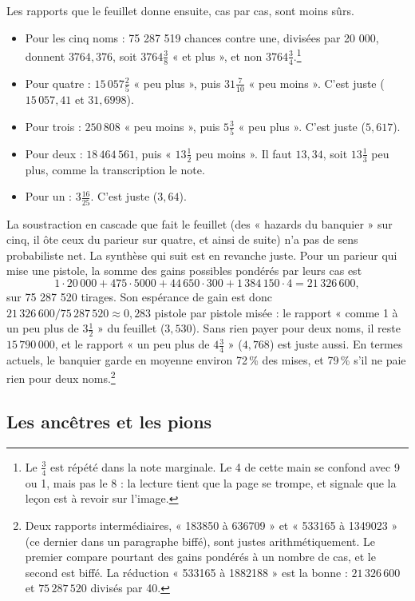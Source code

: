 \documentclass[11pt,a4paper]{article}
\begin{document}
Les rapports que le feuillet donne ensuite, cas par cas, sont moins sûrs.
\begin{itemize}
  \item Pour les cinq noms : 75 287 519 chances contre une, divisées par
    20 000, donnent \(3764{,}376\), soit \(3764\frac38\) « et plus », et non
    \(3764\frac34\).\footnote{Le \(\frac34\) est répété dans la note marginale.
    Le 4 de cette main se confond avec 9 ou 1, mais pas le 8 : la lecture tient
    que la page se trompe, et signale que la leçon est à revoir sur l'image.}
  \item Pour quatre : \(15\,057\frac25\) « peu plus », puis \(31\frac7{10}\)
    « peu moins ». C'est juste (\(15\,057{,}41\) et \(31{,}6998\)).
  \item Pour trois : \(250\,808\) « peu moins », puis \(5\frac35\) « peu plus ».
    C'est juste (\(5{,}617\)).
  \item Pour deux : \(18\,464\,561\), puis « \(13\frac12\) peu moins ». Il faut
    \(13{,}34\), soit \(13\frac13\) peu plus, comme la transcription le note.
  \item Pour un : \(3\frac{16}{25}\). C'est juste (\(3{,}64\)).
\end{itemize}
La soustraction en cascade que fait le feuillet (des « hazards du banquier »
sur cinq, il ôte ceux du parieur sur quatre, et ainsi de suite) n'a pas de sens
probabiliste net. La synthèse qui suit est en revanche juste. Pour un parieur
qui mise une pistole, la somme des gains possibles pondérés par leurs cas
est
\[
1\cdot20\,000+475\cdot5000+44\,650\cdot300+1\,384\,150\cdot4=21\,326\,600 ,
\]
sur 75 287 520 tirages. Son espérance de gain est donc
\(21\,326\,600/75\,287\,520\approx0{,}283\) pistole par pistole misée : le
rapport « comme 1 à un peu plus de \(3\frac12\) » du feuillet
(\(3{,}530\)). Sans rien payer pour deux noms, il reste \(15\,790\,000\), et le
rapport « un peu plus de \(4\frac34\) » (\(4{,}768\)) est juste aussi. En
termes actuels, le banquier garde en moyenne environ 72\,\% des mises, et 79\,\%
s'il ne paie rien pour deux noms.\footnote{Deux rapports intermédiaires,
« 183850 à 636709 » et « 533165 à 1349023 » (ce dernier dans un paragraphe
biffé), sont justes arithmétiquement. Le premier compare pourtant des gains
pondérés à un nombre de cas, et le second est biffé. La réduction
« 533165 à 1882188 » est la bonne : \(21\,326\,600\) et \(75\,287\,520\)
divisés par 40.}

\subsection*{Les ancêtres et les pions}
\end{document}
